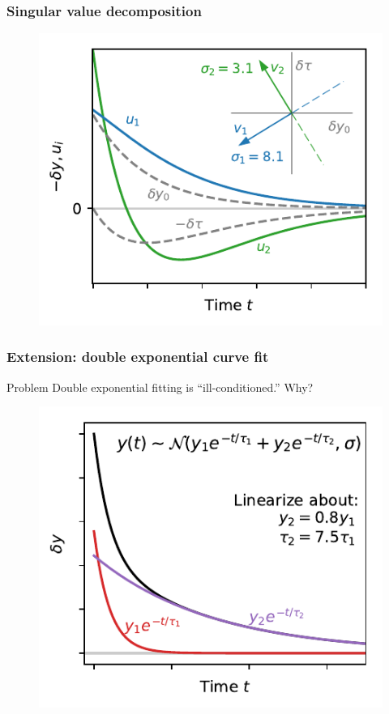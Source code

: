 \documentclass[xcolor={dvipsnames}]{beamer}
\begin{document}
\begin{frame}
\frametitle{Singular value decomposition}
\begin{figure}
\includegraphics[height=0.9\textheight]{figs/dy-usv.pdf}
\end{figure}
\end{frame}

\begin{frame}
\frametitle{Extension: double exponential curve fit}
\begin{block}{Problem}
Double exponential fitting is ``ill-conditioned.'' Why?
\end{block}
\begin{figure}
\includegraphics[height=0.7\textheight]{figs/two-time-constants.pdf}
\end{figure}
\end{frame}
\end{document}
